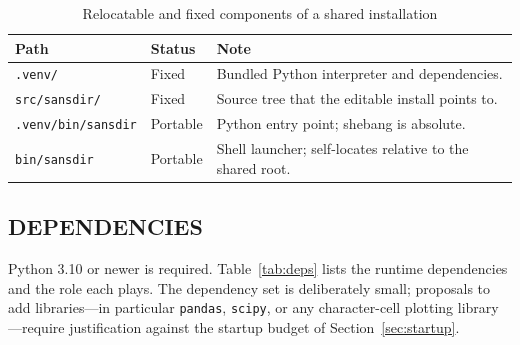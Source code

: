 \documentclass[tm]{ornltm}
\begin{document}
\begin{table}[ht]
  \centering
  \caption{Relocatable and fixed components of a shared installation}
  \label{tab:portable}
  \small
  \begin{tabular}{p{} p{} p{}}
    \toprule
    Path & Status & Note \\
    \midrule
    \texttt{.venv/} & Fixed & Bundled Python interpreter and dependencies. \\
    \texttt{src/sansdir/} & Fixed & Source tree that the editable install
      points to. \\
    \texttt{.venv/bin/sansdir} & Portable & Python entry point; shebang is
      absolute. \\
    \texttt{bin/sansdir} & Portable & Shell launcher; self-locates relative to
      the shared root. \\
    \bottomrule
  \end{tabular}
\end{table}

\subsection{DEPENDENCIES}

Python 3.10 or newer is required. Table~\ref{tab:deps} lists the runtime
dependencies and the role each plays. The dependency set is deliberately small;
proposals to add libraries---in particular \texttt{pandas}, \texttt{scipy}, or
any character-cell plotting library---require justification against the startup
budget of Section~\ref{sec:startup}.
\end{document}
